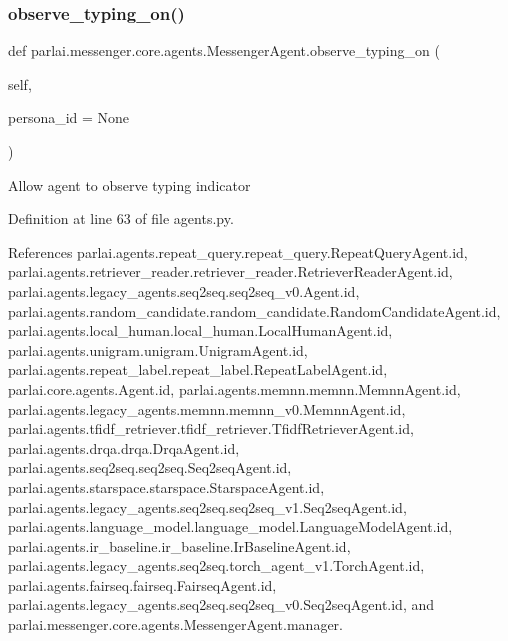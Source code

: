 \mbox{\label{classparlai_1_1messenger_1_1core_1_1agents_1_1MessengerAgent_a692e3ce71bc6c4f8842540049d0e2cae}} 
\subsubsection{\texorpdfstring{observe\+\_\+typing\+\_\+on()}{observe\_typing\_on()}}
{\footnotesize\ttfamily def parlai.\+messenger.\+core.\+agents.\+Messenger\+Agent.\+observe\+\_\+typing\+\_\+on (\begin{DoxyParamCaption}\item[{}]{self,  }\item[{}]{persona\+\_\+id = {\ttfamily None} }\end{DoxyParamCaption})}

\begin{DoxyVerb}Allow agent to observe typing indicator\end{DoxyVerb}
 

Definition at line 63 of file agents.\+py.



References parlai.\+agents.\+repeat\+\_\+query.\+repeat\+\_\+query.\+Repeat\+Query\+Agent.\+id, parlai.\+agents.\+retriever\+\_\+reader.\+retriever\+\_\+reader.\+Retriever\+Reader\+Agent.\+id, parlai.\+agents.\+legacy\+\_\+agents.\+seq2seq.\+seq2seq\+\_\+v0.\+Agent.\+id, parlai.\+agents.\+random\+\_\+candidate.\+random\+\_\+candidate.\+Random\+Candidate\+Agent.\+id, parlai.\+agents.\+local\+\_\+human.\+local\+\_\+human.\+Local\+Human\+Agent.\+id, parlai.\+agents.\+unigram.\+unigram.\+Unigram\+Agent.\+id, parlai.\+agents.\+repeat\+\_\+label.\+repeat\+\_\+label.\+Repeat\+Label\+Agent.\+id, parlai.\+core.\+agents.\+Agent.\+id, parlai.\+agents.\+memnn.\+memnn.\+Memnn\+Agent.\+id, parlai.\+agents.\+legacy\+\_\+agents.\+memnn.\+memnn\+\_\+v0.\+Memnn\+Agent.\+id, parlai.\+agents.\+tfidf\+\_\+retriever.\+tfidf\+\_\+retriever.\+Tfidf\+Retriever\+Agent.\+id, parlai.\+agents.\+drqa.\+drqa.\+Drqa\+Agent.\+id, parlai.\+agents.\+seq2seq.\+seq2seq.\+Seq2seq\+Agent.\+id, parlai.\+agents.\+starspace.\+starspace.\+Starspace\+Agent.\+id, parlai.\+agents.\+legacy\+\_\+agents.\+seq2seq.\+seq2seq\+\_\+v1.\+Seq2seq\+Agent.\+id, parlai.\+agents.\+language\+\_\+model.\+language\+\_\+model.\+Language\+Model\+Agent.\+id, parlai.\+agents.\+ir\+\_\+baseline.\+ir\+\_\+baseline.\+Ir\+Baseline\+Agent.\+id, parlai.\+agents.\+legacy\+\_\+agents.\+seq2seq.\+torch\+\_\+agent\+\_\+v1.\+Torch\+Agent.\+id, parlai.\+agents.\+fairseq.\+fairseq.\+Fairseq\+Agent.\+id, parlai.\+agents.\+legacy\+\_\+agents.\+seq2seq.\+seq2seq\+\_\+v0.\+Seq2seq\+Agent.\+id, and parlai.\+messenger.\+core.\+agents.\+Messenger\+Agent.\+manager.

